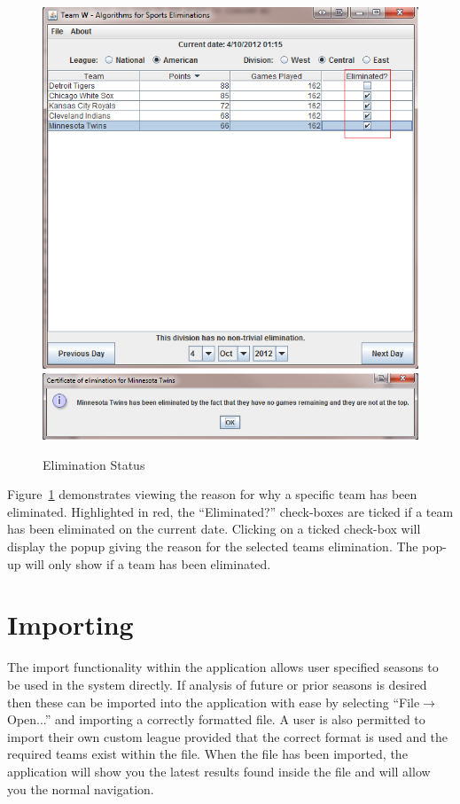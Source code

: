 \begin{figure}
  \includegraphics[width=\linewidth,keepaspectratio]{images/userManualDesk4.png}
  \includegraphics[width=\linewidth,keepaspectratio]{images/userManualDesk5.png}
  \caption{Elimination Status}\label{fig:ELIMSTAT}
\end{figure}

Figure~\ref{fig:ELIMSTAT} demonstrates viewing the reason for why a
specific team has been eliminated. Highlighted in red, the
``Eliminated?'' check-boxes are ticked if a team has been eliminated
on the current date. Clicking on a ticked check-box will display the
popup giving the reason for the selected teams elimination. The pop-up
will only show if a team has been eliminated.

\newpage

\section{Importing}
\label{sec:Importing}
The import functionality within the application allows user specified
seasons to be used in the system directly. If analysis of future or
prior seasons is desired then these can be imported into the
application with ease by selecting ``File$\rightarrow$Open...'' and importing a
correctly formatted file. A user is also permitted to import their own
custom league provided that the correct format is used and the
required teams exist within the file. When the file has been imported,
the application will show you the latest results found inside the file
and will allow you the normal navigation.

